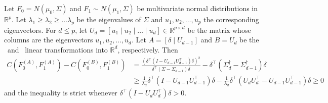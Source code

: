 \documentclass[11pt]{extarticle}
\begin{document}
\begin{thm}
\label{thm:Chernoff1}
Let $F_0 = N(\mu_0, \Sigma)$ and $F_1 \sim N(\mu_1, \Sigma)$ be multivariate normal distributions in $\mathbb{R}^{p}$. Let $\lambda_1 \geq \lambda_2 \geq \dots \lambda_p$ be the eigenvalues of $\Sigma$ and $u_1, u_2, \dots, u_p$ the corresponding eigenvectors. For $d \leq p$, let $U_{d} = [u_1 \mid u_2 \mid \dots \mid u_{d}] \in \mathbb{R}^{p \times d}$
be the matrix whose columns are the eigenvectors $u_1, u_2, \dots, u_{d}$. Let $A = [\delta \mid U_{d-1}]$ and $B = U_{d}$ be the \Lol~and \Lda~linear transformations into $\mathbb{R}^{d}$, respectively.
Then
\begin{equation}
\label{eq:chernoff_arbitrary1}
\begin{split}
C(F_0^{(A)}, F_1^{(A)}) - C(F_0^{(B)}, F_1^{(B)}) &= \frac{(\delta^{\top} (I - U_{d-1} U_{d-1}^{\top}) \delta)^{2}}{\delta^{\top} (\Sigma - \Sigma_{d-1}) \delta} - \delta^{\top} (\Sigma_{d}^{\dagger} - \Sigma_{d-1}^{\dagger}) \delta \\ &
\geq \frac{1}{\lambda_d} \delta^{\top} (I - U_{d-1}U_{d-1}^{\top}) \delta - \frac{1}{\lambda_d} \delta^{\top} (U_{d} U_{d}^{\top} - U_{d-1} U_{d-1}^{\top}) \delta \geq 0
\end{split}
\end{equation}
and the inequality is strict whenever $\delta^{\top} (I - U_d U_d^{\top}) \delta > 0$.
\end{thm}
\end{document}
